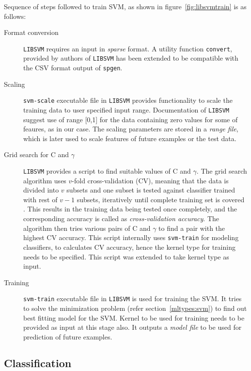 Sequence of steps followed to train SVM, as shown in figure~\ref{fig:libsvmtrain} is as follows:
\begin{description}
   \item[Format conversion] \texttt{LIBSVM} requires an input in \emph{sparse} format. A utility function \texttt{convert}, provided by authors of \texttt{LIBSVM} has been extended to be compatible with the CSV format output of \texttt{spgen}.

  \item[Scaling] \texttt{svm-scale} executable file in \texttt{LIBSVM} provides functionality to scale the training data to user specified input range. Documentation of \texttt{LIBSVM} \cite{Hsu2003} suggest use of range [0,1] for the data containing zero values for some of feaures, as in our case. The scaling parameters are stored in a \emph{range file}, which is later used to scale features of future examples or the test data.
  
  \item[Grid search for C and $\gamma$] \texttt{LIBSVM} provides a script to find suitable values of C and $\gamma$. The grid search algorithm uses $v$-fold cross-validation (CV), meaning that the data is divided into $v$ subsets and one subset is tested against classifier trained with rest of $v-1$ subsets, iteratively until complete training set is covered \cite{Hsu2003}. This results in the training data being tested once completely, and the corresponding accuracy is called as \emph{cross-validation accuracy}. The algorithm then tries various pairs of C and $\gamma$ to find a pair with the highest CV accuracy. This script internally uses \texttt{svm-train} for modeling classifiers, to calculates CV accuracy, hence the kernel type for training needs to be specified. This script was extended to take kernel type as input.
 
 \item[Training] \texttt{svm-train} executable file in \texttt{LIBSVM} is used for training the SVM. It tries to solve the minimization problem (refer section~\ref{mltypes:svm}) to find out best fitting model for the SVM. Kernel to be used for training needs to be provided as input at this stage also. It outputs a \emph{model file} to be used for prediction of future examples.
\end{description}

\subsection{Classification}

